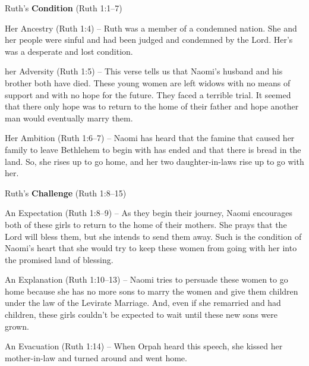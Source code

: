 \begin{compactenum}[I.][7]
    \item Ruth's \textbf{Condition} (Ruth 1:1--7)
    \begin{compactenum}[A.][7]
    	\item Her Ancestry (Ruth 1:4) -- Ruth was a member of a condemned nation. She and her people were sinful and had been judged and condemned by the Lord. Her's was a desperate and lost condition.
    	\item her Adversity (Ruth 1:5) -- This verse tells us that Naomi's husband and his brother both have died. These young women are left widows with no means of support and with no hope for the future. They faced a terrible trial. It seemed that there only hope was to return to the home of their father and hope another man would eventually marry them.
    	\item Her Ambition (Ruth 1:6--7) -- Naomi has heard that the famine that caused her family to leave Bethlehem to begin with has ended and that there is bread in the land. So, she rises up to go home, and her two daughter-in-laws rise up to go with her.
    \end{compactenum}
    \item Ruth's \textbf{Challenge} (Ruth 1:8--15)
    \begin{compactenum}[A.][7]
    	\item An Expectation (Ruth 1:8--9) -- As they begin their journey, Naomi encourages both of these girls to return to the home of their mothers. She prays that the Lord will bless them, but she intends to send them away. Such is the condition of Naomi's heart that she would try to keep these women from going with her into the promised land of blessing.
    	\item An Explanation (Ruth 1:10--13) -- Naomi tries to persuade these women to go home because she has no more sons to marry the women and give them children under the law of the Levirate Marriage. And, even if she remarried and had children, these girls couldn't be expected to wait until these new sons were grown.
    	\item An Evacuation (Ruth 1:14) -- When Orpah heard this speech, she kissed her mother-in-law and turned around and went home.

\end{compactenum}
\end{compactenum}
